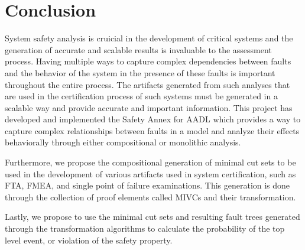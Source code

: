 \chapter{Conclusion}
System safety analysis is cruicial in the development of critical systems and the generation of accurate and scalable results is invaluable to the assessment process. Having multiple ways to capture complex dependencies between faults and the behavior of the system in the presence of these faults is important throughout the entire process. The artifacts generated from such analyses that are used in the certification process of such systems must be generated in a scalable way and provide accurate and important information. This project has developed and implemented the Safety Annex for AADL which provides a way to capture complex relationships between faults in a model and analyze their effects behaviorally through either compositional or monolithic analysis. 

Furthermore, we propose the compositional generation of minimal cut sets to be used in the development of various artifacts used in system certification, such as FTA, FMEA, and single point of failure examinations. This generation is done through the collection of proof elements called MIVCs and their transformation. 

Lastly, we propose to use the minimal cut sets and resulting fault trees generated through the transformation algorithms to calculate the probability of the top level event, or violation of the safety property.   

